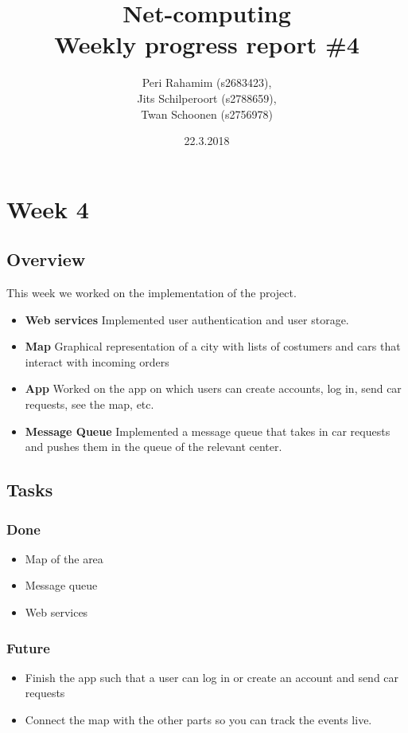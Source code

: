 \documentclass[a4paper]{article}
\begin{document}
\title{Net-computing\\
Weekly progress report \#4
}

\date{22.3.2018}

\author{Peri Rahamim (s2683423),\\
Jits Schilperoort (s2788659),\\
Twan Schoonen (s2756978)
}


\maketitle
\section*{Week 4}
\subsection*{Overview}
This week we worked on the implementation of the project.
\begin{itemize}
    \item \textbf{Web services} Implemented user authentication and user storage.
    \item \textbf{Map} Graphical representation of a city with lists of costumers and cars that interact with incoming orders
    \item \textbf{App} Worked on the app on which users can create accounts, log in, send car requests, see the map, etc.
    \item \textbf{Message Queue} Implemented a message queue that takes in car requests and pushes them in the queue of the relevant center. 
\end{itemize}

\subsection*{Tasks}
\subsubsection*{Done}
\begin{itemize}
    \item Map of the area
    \item Message queue
    \item Web services
\end{itemize}

\subsubsection*{Future}
\begin{itemize}
    \item Finish the app such that a user can log in or create an account and send car requests
    \item Connect the map with the other parts so you can track the events live.
\end{itemize}
\end{document}
